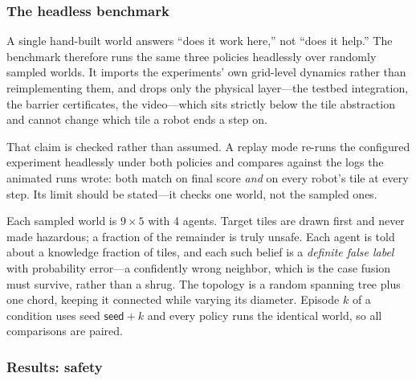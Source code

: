 \documentclass[11pt]{article}
\newif\ifshowcomments
\theoremstyle{definition}
\theoremstyle{remark}
\newcommand{\task}[1]{%
    \ifshowcomments
        ~\todo[inline, color=buzzgold!60, textcolor=black,caption={Task}]{{\bf Task:} #1}%
    \fi
}
\newcommand{\ai}[1]{%
    \ifshowcomments
        \noindent\textcolor{techred}{[AI Agent]: #1}%
    \fi
}
\begin{document}
\task{Insert video stills: the initial assignment with interfaces open, an intermediate
iterate, and the settled state with all interfaces agreeing and the contested tiles marked.
These are frames from the runs already in the repository.}
\ai{Done, and upgraded: \Cref{fig:stills} shows four overhead-camera stills of the
\emph{physical} testbed execution rather than simulator frames.}

\subsubsection{The headless benchmark}
\label{sec:benchmark}

A single hand-built world answers ``does it work here,'' not ``does it help.''
The benchmark therefore runs the same three policies headlessly over randomly sampled worlds.
It imports the experiments' own grid-level dynamics rather than reimplementing them, and drops
only the physical layer---the testbed integration, the barrier certificates, the video---which
sits strictly below the tile abstraction and cannot change which tile a robot ends a step on.

That claim is checked rather than assumed.
A replay mode re-runs the configured experiment headlessly under both policies and compares
against the logs the animated runs wrote: both match on final score \emph{and} on every robot's
tile at every step.
Its limit should be stated---it checks one world, not the sampled ones.

Each sampled world is $9 \times 5$ with 4 agents.
Target tiles are drawn first and never made hazardous; a fraction of the remainder is truly
unsafe.
Each agent is told about a \textsf{knowledge} fraction of tiles, and each such belief is a
\emph{definite false label} with probability \textsf{error}---a confidently wrong neighbor,
which is the case fusion must survive, rather than a shrug.
The topology is a random spanning tree plus one chord, keeping it connected while varying its
diameter.
Episode $k$ of a condition uses seed $\textsf{seed}+k$ and every policy runs the identical
world, so all comparisons are paired.

\subsubsection{Results: safety}
\label{sec:safety}
\end{document}
